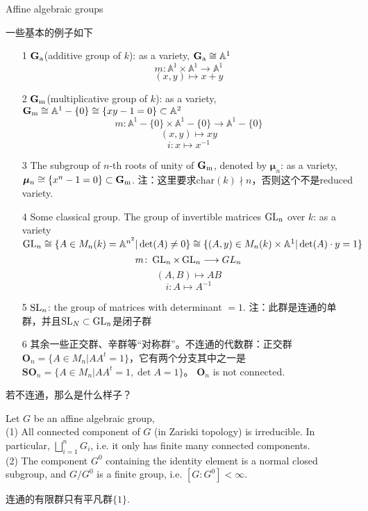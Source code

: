 \begin{definition}
	Affine algebraic groups
\end{definition}
\begin{example}一些基本的例子如下
	\begin{itemize}
		\item[1] $\mathbf{G}_\mathrm{a}$(additive group of $k$): as a variety, $\mathbf{G}_\mathrm{a} \cong \mathbb{A}^1$
		\[m \colon \mathbb{A}^1 \times \mathbb{A}^1 \longrightarrow \mathbb{A}^1\]
		\[(x,y) \mapsto x+y\]
		\item[2] $\mathbf{G}_\mathrm{m}$(multiplicative group of $k$): as a variety, $\mathbf{G}_\mathrm{m} \cong \mathbb{A}^1-\{0\}\cong \{xy-1=0\}\subset \mathbb{A}^2$
		\[m \colon \mathbb{A}^1-\{0\} \times \mathbb{A}^1-\{0\} \longrightarrow \mathbb{A}^1-\{0\}\]
		\[(x,y) \mapsto xy\]
		\[i \colon x \mapsto x^{-1}\]
		\item[3] The subgroup of $n$-th roots of unity of $\mathbf{G}_\mathrm{m}$, denoted by $\bm{\mu}_n$: as a variety, $\bm{\mu}_n \cong \{x^n-1=0\}\subset\mathbf{G}_\mathrm{m}$. 注：这里要求$\mbox{char}(k) \nmid n$，否则这个不是reduced variety.
		\item[4] Some classical group. The group of invertible matrices $\operatorname {GL}_n$ over $k$: as a variety $\operatorname {GL}_n \cong \{A \in M_n(k)=\mathbb{A}^{n^2}| \det (A) \neq 0\} \cong \{(A,y)\in M_n(k)\times \mathbb{A}^1 | \det(A)\cdot y=1\}$
		\[m\colon \operatorname {GL}_n \times \operatorname {GL}_n \longrightarrow GL_n\]
		\[(A,B)\mapsto AB\]
		\[i\colon A\mapsto A^{-1}\]
		\item[5] $\operatorname {SL}_n$: the group of matrices with determinant $=1$. 注：此群是连通的单群，并且$\operatorname {SL}_N\subset \operatorname {GL}_n$是闭子群
		\item[6] 其余一些正交群、辛群等“对称群”。不连通的代数群：正交群$\bm{O}_n=\{A\in M_n |AA^t=1\}$，它有两个分支其中之一是$\bm{SO}_n=\{A\in M_n | AA^t=1,\det A=1\}$。 $\bm{O}_n$ is not connected.
	\end{itemize}
\end{example}若不连通，那么是什么样子？
\begin{prop}
	Let $G$ be an affine algebraic group,\\
	(1) All connected component of $G$ (in Zariski topology) is irreducible. In particular, $\bigsqcup_{i=1}^n G_i$, i.e. it only has finite many connected components.\\
	(2) The component $G^0$ containing the identity element is a normal closed subgroup, and $G/G^0$ is a finite group, i.e. $[G:G^0]<\infty$.
\end{prop}
连通的有限群只有平凡群$\{1\}$.
